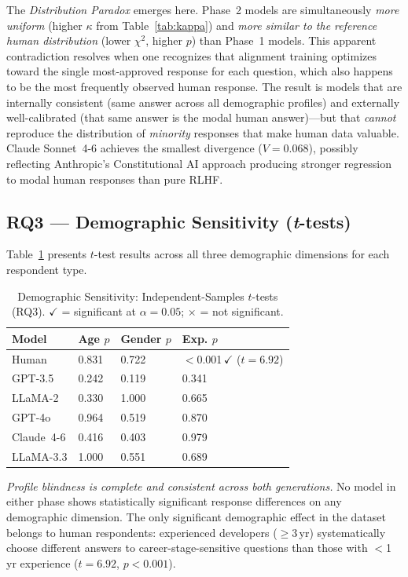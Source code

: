 \documentclass[sigconf,nonacm]{acmart}
\newcommand{\distrpar}{\textit{Distribution Paradox}\xspace}
\begin{document}
The \distrpar emerges here.
Phase~2 models are simultaneously \emph{more uniform} (higher $\kappa$ from
Table~\ref{tab:kappa}) and \emph{more similar to the reference human
distribution} (lower $\chi^2$, higher $p$) than Phase~1 models.
This apparent contradiction resolves when one recognizes that alignment
training optimizes toward the single most-approved response for each
question, which also happens to be the most frequently observed human
response.
The result is models that are internally consistent (same answer across
all demographic profiles) and externally well-calibrated (that same answer
is the modal human answer)---but that \emph{cannot} reproduce the
distribution of \emph{minority} responses that make human data valuable.
Claude Sonnet~4-6 achieves the smallest divergence ($V{=}0.068$), possibly
reflecting Anthropic's Constitutional AI approach producing stronger
regression to modal human responses than pure RLHF.

\subsection{RQ3 --- Demographic Sensitivity (\textit{t}-tests)}
\label{sec:results:ttest}

Table~\ref{tab:ttest} presents $t$-test results across all three demographic
dimensions for each respondent type.

\begin{table}[t]
\caption{Demographic Sensitivity: Independent-Samples $t$-tests (RQ3).
  $\checkmark$ = significant at $\alpha{=}0.05$; $\times$ = not significant.}
\label{tab:ttest}
\centering\small
\setlength{\tabcolsep}{4pt}
\begin{tabular}{llll}
\toprule
\textbf{Model} & \textbf{Age} $p$ & \textbf{Gender} $p$ & \textbf{Exp.} $p$ \\
\midrule
Human       & 0.831 & 0.722 & $<$0.001\,$\checkmark$ ($t{=}6.92$) \\
\midrule
GPT-3.5     & 0.242 & 0.119 & 0.341 \\
LLaMA-2     & 0.330 & 1.000 & 0.665 \\
\midrule
GPT-4o      & 0.964 & 0.519 & 0.870 \\
Claude~4-6  & 0.416 & 0.403 & 0.979 \\
LLaMA-3.3   & 1.000 & 0.551 & 0.689 \\
\bottomrule
\end{tabular}
\end{table}

\emph{Profile blindness is complete and consistent across both generations.}
No model in either phase shows statistically significant response differences
on any demographic dimension.
The only significant demographic effect in the dataset belongs to human
respondents: experienced developers ($\geq$3\,yr) systematically choose
different answers to career-stage-sensitive questions than those with
$<$1\,yr experience ($t{=}6.92$, $p{<}0.001$).
\end{document}
